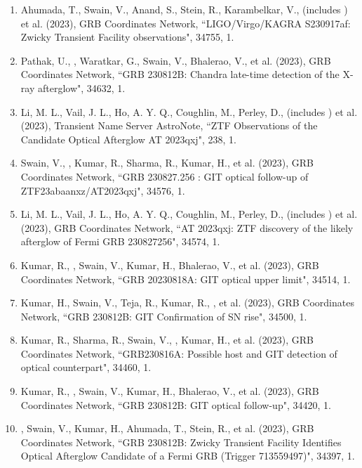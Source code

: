 \begin{enumerate}
\item Ahumada, T., Swain, V., Anand, S., Stein, R., Karambelkar, V., (includes \me) et al. (2023), GRB Coordinates Network, {``LIGO/Virgo/KAGRA S230917af: Zwicky Transient Facility observations"}, 34755, 1.

\item Pathak, U., \me, Waratkar, G., Swain, V., Bhalerao, V., et al. (2023), GRB Coordinates Network, {``GRB 230812B: Chandra late-time detection of the X-ray afterglow"}, 34632, 1.

\item Li, M. L., Vail, J. L., Ho, A. Y. Q., Coughlin, M., Perley, D., (includes \me) et al. (2023), Transient Name Server AstroNote, {``ZTF Observations of the Candidate Optical Afterglow AT 2023qxj"}, 238, 1.

\item Swain, V., \me, Kumar, R., Sharma, R., Kumar, H., et al. (2023), GRB Coordinates Network, {``GRB 230827.256 : GIT optical follow-up of ZTF23abaanxz/AT2023qxj"}, 34576, 1.

\item Li, M. L., Vail, J. L., Ho, A. Y. Q., Coughlin, M., Perley, D., (includes \me) et al. (2023), GRB Coordinates Network, {``AT 2023qxj: ZTF discovery of the likely afterglow of Fermi GRB 230827256"}, 34574, 1.

\item Kumar, R., \me, Swain, V., Kumar, H., Bhalerao, V., et al. (2023), GRB Coordinates Network, {``GRB 20230818A: GIT optical upper limit"}, 34514, 1.

\item Kumar, H., Swain, V., Teja, R., Kumar, R., \me, et al. (2023), GRB Coordinates Network, {``GRB 230812B: GIT Confirmation of SN rise"}, 34500, 1.

\item Kumar, R., Sharma, R., Swain, V., \me, Kumar, H., et al. (2023), GRB Coordinates Network, {``GRB230816A: Possible host and GIT detection of optical counterpart"}, 34460, 1.

\item Kumar, R., \me, Swain, V., Kumar, H., Bhalerao, V., et al. (2023), GRB Coordinates Network, {``GRB 230812B: GIT optical follow-up"}, 34420, 1.

\item \me, Swain, V., Kumar, H., Ahumada, T., Stein, R., et al. (2023), GRB Coordinates Network, {``GRB 230812B: Zwicky Transient Facility Identifies Optical Afterglow Candidate of a Fermi GRB (Trigger 713559497)"}, 34397, 1.


\end{enumerate}
